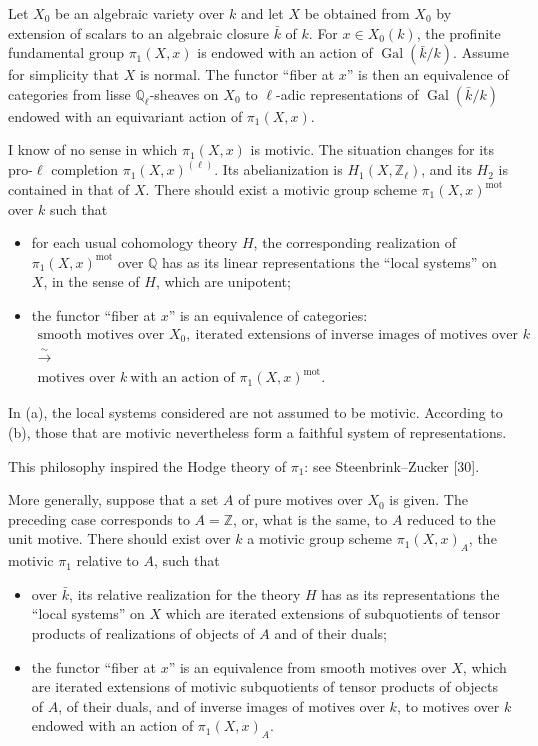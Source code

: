 \documentclass[11pt,a4paper]{article}
\theoremstyle{plain}
\theoremstyle{definition}
\DeclareMathOperator{\Gal}{Gal}
\newcommand{\Q}{\mathbb{Q}}
\newcommand{\Z}{\mathbb{Z}}
\DeclareMathOperator{\mot}{mot}
\begin{document}
Let $X_0$ be an algebraic variety over $k$ and let $X$ be obtained from $X_0$ by extension of scalars to an algebraic closure $\bar{k}$ of $k$. For $x\in X_0(k)$, the profinite fundamental group $\pi_1(X,x)$ is endowed with an action of $\Gal(\bar{k}/k)$. Assume for simplicity that $X$ is normal. The functor ``fiber at $x$'' is then an equivalence of categories from lisse $\Q_\ell$-sheaves on $X_0$ to $\ell$-adic representations of $\Gal(\bar{k}/k)$ endowed with an equivariant action of $\pi_1(X,x)$.

I know of no sense in which $\pi_1(X,x)$ is motivic. The situation changes for its pro-$\ell$ completion $\pi_1(X,x)^{(\ell)}$. Its abelianization is $H_1(X,\Z_\ell)$, and its $H_2$ is contained in that of $X$. There should exist a motivic group scheme $\pi_1(X,x)^{\mot}$ over $k$ such that
\begin{itemize}
\item[(a)] for each usual cohomology theory $H$, the corresponding realization of $\pi_1(X,x)^{\mot}$ over $\Q$ has as its linear representations the ``local systems'' on $X$, in the sense of $H$, which are unipotent;
\item[(b)] the functor ``fiber at $x$'' is an equivalence of categories:
\[
\begin{gathered}
\text{smooth motives over }X_0,\ \text{iterated extensions of inverse images of motives over }k \\
\xrightarrow{\sim} \\
\text{motives over }k\ \text{with an action of }\pi_1(X,x)^{\mot}.
\end{gathered}
\]
\end{itemize}

In (a), the local systems considered are not assumed to be motivic. According to (b), those that are motivic nevertheless form a faithful system of representations.

This philosophy inspired the Hodge theory of $\pi_1$: see Steenbrink--Zucker [30].

More generally, suppose that a set $A$ of pure motives over $X_0$ is given. The preceding case corresponds to $A=\Z$, or, what is the same, to $A$ reduced to the unit motive. There should exist over $k$ a motivic group scheme $\pi_1(X,x)_A$, the motivic $\pi_1$ relative to $A$, such that
\begin{itemize}
\item[(a$'$)] over $\bar{k}$, its relative realization for the theory $H$ has as its representations the ``local systems'' on $X$ which are iterated extensions of subquotients of tensor products of realizations of objects of $A$ and of their duals;
\item[(b$'$)] the functor ``fiber at $x$'' is an equivalence from smooth motives over $X$, which are iterated extensions of motivic subquotients of tensor products of objects of $A$, of their duals, and of inverse images of motives over $k$, to motives over $k$ endowed with an action of $\pi_1(X,x)_A$.
\end{itemize}
\end{document}
